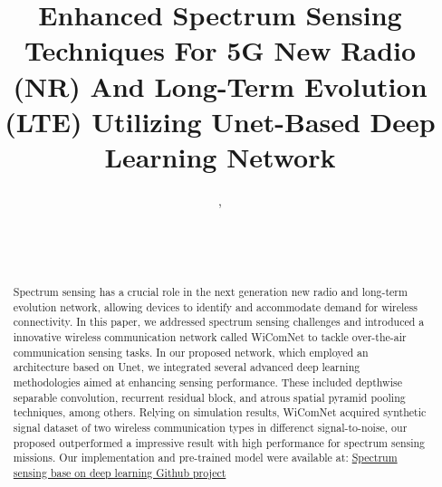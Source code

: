 \documentclass[journal]{IEEEtran} %
\begin{document}
\title{Enhanced Spectrum Sensing Techniques For 5G New Radio (NR) And Long-Term Evolution (LTE) Utilizing Unet-Based Deep Learning Network\\
}

\author{%
    , %
    \\%
    \\%
    \\%
     \\
}

\maketitle

\begin{abstract}
Spectrum sensing has a crucial role in the next generation new radio and long-term evolution network, allowing devices to identify and accommodate demand for wireless connectivity. In this paper, we addressed spectrum sensing challenges and introduced a innovative wireless communication network called WiComNet to tackle over-the-air communication sensing tasks. In our proposed network, which employed an architecture based on Unet, we integrated several advanced deep learning methodologies aimed at enhancing sensing performance. These included depthwise separable convolution, recurrent residual block, and atrous spatial pyramid pooling techniques, among others. Relying on simulation results, WiComNet acquired synthetic signal dataset of two wireless communication types in differenct signal-to-noise, our proposed outperformed a impressive result with high performance for spectrum sensing missions. Our implementation and pre-trained model were available at:
    \href{https://github.com/Winxkin/Spectrum_sensing_base_on_Deep_learning.git}{Spectrum sensing base on deep learning Github project}
\end{abstract}
\end{document}
